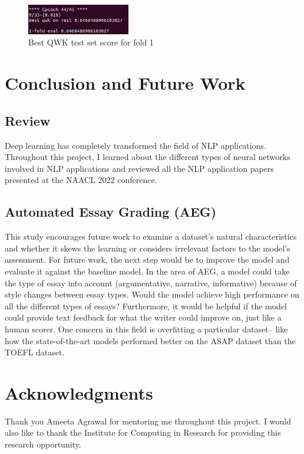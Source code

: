 \documentclass[11pt]{article}
\begin{document}
\begin{figure}
\centering
\includegraphics[width=0.4\textwidth]{resultstest.png}
\caption{Best QWK test set score for fold 1}
\end{figure}

\section{Conclusion and Future Work}
\subsection{Review}
Deep learning has completely transformed the field of NLP applications. Throughout this project, I learned about the different types of neural networks involved in NLP applications and reviewed all the NLP application papers presented at the NAACL 2022 conference. 

\subsection{Automated Essay Grading (AEG)}
This study encourages future work to examine a dataset's natural characteristics and whether it skews the learning or considers irrelevant factors to the model's assessment. For future work, the next step would be to improve the model and evaluate it against the baseline model. In the area of AEG, a model could take the type of essay into account (argumentative, narrative, informative) because of style changes between essay types. Would the model achieve high performance on all the different types of essays? Furthermore, it would be helpful if the model could provide text feedback for what the writer could improve on, just like a human scorer. One concern in this field is overfitting a particular dataset– like how the state-of-the-art models performed better on the ASAP dataset than the TOEFL dataset.



\section*{Acknowledgments}
Thank you Ameeta Agrawal for mentoring me throughout this project. I would also like to thank the Institute for Computing in Research for providing this research opportunity. 
\end{document}
